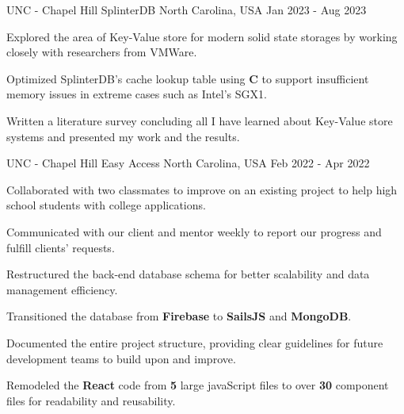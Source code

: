 

\begin{cventries}

  \cventry
    {UNC - Chapel Hill} %
    {SplinterDB} %
    {North Carolina, USA} %
    {Jan 2023 - Aug 2023} %
    {
      \begin{cvitems} %
        \item {Explored the area of Key-Value store for modern solid state storages by working closely with researchers from VMWare.}
        \item {Optimized SplinterDB's cache lookup table using \textbf{C} to support insufficient memory issues in extreme cases such as Intel's SGX1.}
        \item {Written a literature survey concluding all I have learned about Key-Value store systems and presented my work and the results.}
      \end{cvitems}
    }

  \cventry
  {UNC - Chapel Hill} %
  {Easy Access} %
  {North Carolina, USA} %
  {Feb 2022 - Apr 2022} %
  {
    \begin{cvitems} %
      \item {Collaborated with two classmates to improve on an existing project to help high school students with college applications.}
      \item {Communicated with our client and mentor weekly to report our progress and fulfill clients' requests.}
      \item {Restructured the back-end database schema for better scalability and data management efficiency.}
      \item {Transitioned the database from \textbf{Firebase} to \textbf{SailsJS} and \textbf{MongoDB}.}
      \item {Documented the entire project structure, providing clear guidelines for future development teams to build upon and improve.}
      \item {Remodeled the \textbf{React} code from \textbf{5} large javaScript files to over \textbf{30} component files for readability and reusability.}
    \end{cvitems}
  }


\end{cventries}

